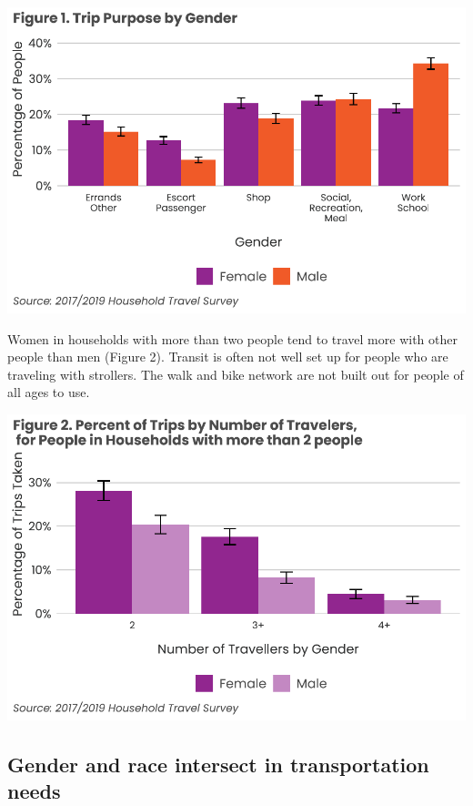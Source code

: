 \documentclass[
  12pt,
]{article}
\begin{document}
\includegraphics{womens_history_story_draft_files/figure-latex/trip by gender-1.pdf}

\begin{flushleft}
Women in households with more than two people tend to travel more with other people than men (Figure 2). Transit is often not well set up for people who are traveling with strollers. The walk and bike network are not built out for people of all ages to use.
\end{flushleft}

\includegraphics{womens_history_story_draft_files/figure-latex/Trips by Number of Travellers-1.pdf}
\newpage \pagestyle{otherpages} \setlength{\headheight}{10pt}
\setlength{\textheight}{665pt} \fancyhead[L]{}

\hypertarget{gender-and-race-intersect-in-transportation-needs}{%
\subsection{Gender and race intersect in transportation
needs}\label{gender-and-race-intersect-in-transportation-needs}}
\end{document}
